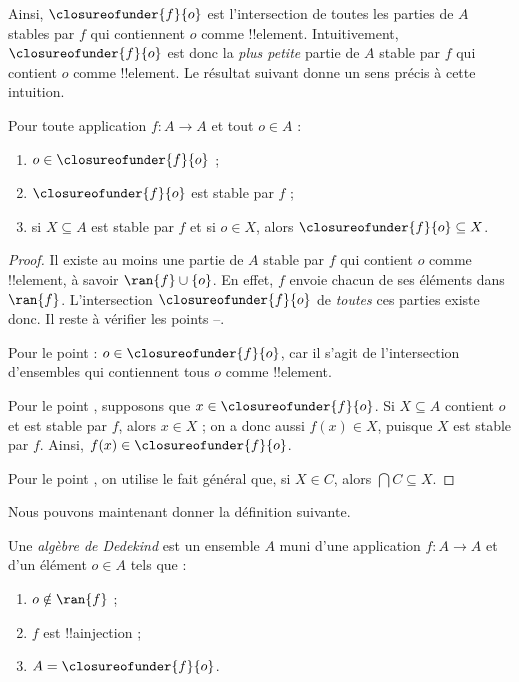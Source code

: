 \documentclass[../../../include/open-logic-section]{subfiles}
\begin{document}
Ainsi, $\closureofunder{f}{o}$ est l'intersection de toutes les parties
de $A$ stables par $f$ qui contiennent $o$ comme !!{element}.
Intuitivement, $\closureofunder{f}{o}$ est donc la \emph{plus petite}
partie de $A$ stable par $f$ qui contient $o$ comme !!{element}.
Le résultat suivant donne un sens précis à cette intuition.
\begin{lem}
	Pour toute application $f\colon A\to A$ et tout $o \in A$ :
	\begin{enumerate}
		\item{} $o \in \closureofunder{f}{o}$ ;
		\item{} $\closureofunder{f}{o}$ est stable par $f$ ;
		\item{} si $X\subseteq A$ est stable par $f$
		et si $o \in X$, alors $\closureofunder{f}{o} \subseteq X$.
	\end{enumerate}
\end{lem}

\begin{proof}
Il existe au moins une partie de $A$ stable par $f$ qui contient $o$
comme !!{element}, à savoir $\ran{f}\cup\{o\}$.
En effet, $f$ envoie chacun de ses éléments dans $\ran{f}$.
L'intersection $\closureofunder{f}{o}$ de \emph{toutes} ces parties
existe donc. Il reste à vérifier les points
--.

Pour le point  :
$o \in \closureofunder{f}{o}$, car il s'agit de l'intersection
d'ensembles qui contiennent tous $o$ comme !!{element}.

Pour le point , supposons que
$x \in \closureofunder{f}{o}$. Si $X\subseteq A$ contient $o$
et est stable par $f$, alors $x \in X$ ; on a donc aussi $f(x) \in X$,
puisque $X$ est stable par $f$. Ainsi,
$f(x) \in \closureofunder{f}{o}$.

Pour le point , on utilise le fait général
que, si $X \in C$, alors $\bigcap C \subseteq X$.
\end{proof}

Nous pouvons maintenant donner la définition suivante.

\begin{defn}
Une \emph{algèbre de Dedekind} est un ensemble $A$ muni d'une application
$f\colon A\to A$ et d'un élément $o\in A$ tels que :
	\begin{enumerate}
		\item {} $o \notin \ran{f}$ ;
		\item {} $f$ est !!a{injection} ;
		\item {} $A = \closureofunder{f}{o}$.
	\end{enumerate}
\end{defn}
\end{document}
